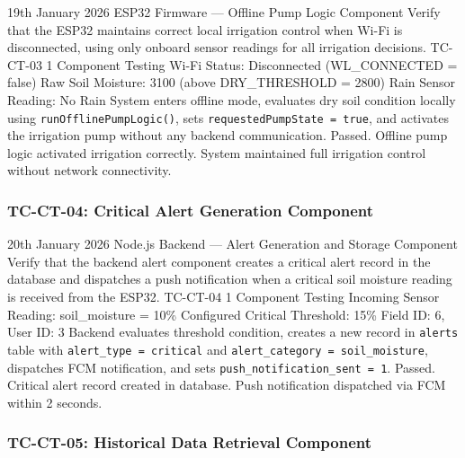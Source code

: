 \testcase%
{19th January 2026}%
{ESP32 Firmware --- Offline Pump Logic Component}%
{Verify that the ESP32 maintains correct local irrigation
control when Wi-Fi is disconnected, using only onboard
sensor readings for all irrigation decisions.}%
{TC-CT-03}%
{1}%
{Component Testing}%
{Wi-Fi Status: Disconnected (WL\_CONNECTED = false) \newline
Raw Soil Moisture: 3100 (above DRY\_THRESHOLD = 2800) \newline
Rain Sensor Reading: No Rain}%
{System enters offline mode, evaluates dry soil condition
locally using \texttt{runOfflinePumpLogic()}, sets
\texttt{requestedPumpState = true}, and activates the
irrigation pump without any backend communication.}%
{Passed. Offline pump logic activated irrigation correctly.
System maintained full irrigation control without network
connectivity.}

\subsubsection{TC-CT-04: Critical Alert Generation Component}

\testcase%
{20th January 2026}%
{Node.js Backend --- Alert Generation and Storage Component}%
{Verify that the backend alert component creates a critical
alert record in the database and dispatches a push
notification when a critical soil moisture reading is
received from the ESP32.}%
{TC-CT-04}%
{1}%
{Component Testing}%
{Incoming Sensor Reading: soil\_moisture = 10\% \newline
Configured Critical Threshold: 15\% \newline
Field ID: 6, User ID: 3}%
{Backend evaluates threshold condition, creates a new
record in \texttt{alerts} table with
\texttt{alert\_type = critical} and
\texttt{alert\_category = soil\_moisture}, dispatches
FCM notification, and sets
\texttt{push\_notification\_sent = 1}.}%
{Passed. Critical alert record created in database. Push
notification dispatched via FCM within 2 seconds.}

\subsubsection{TC-CT-05: Historical Data Retrieval Component}

